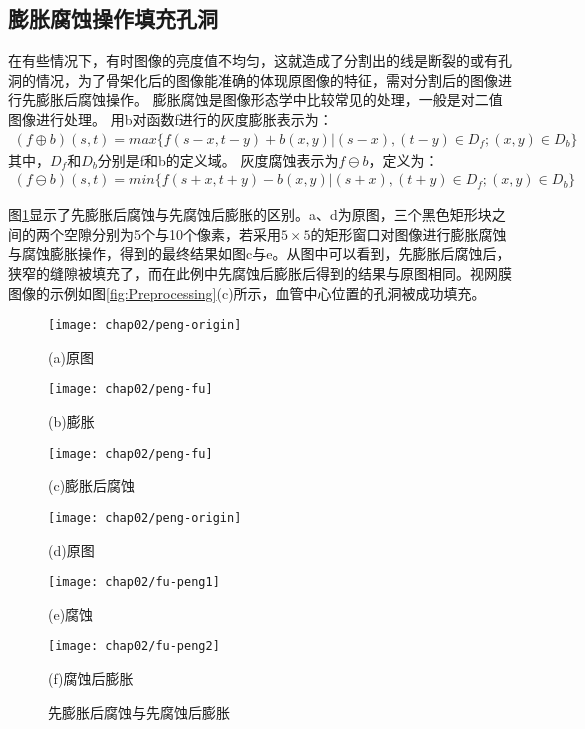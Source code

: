\subsection{膨胀腐蚀操作填充孔洞}
在有些情况下，有时图像的亮度值不均匀，这就造成了分割出的线是断裂的或有孔洞的情况，为了骨架化后的图像能准确的体现原图像的特征，需对分割后的图像进行先膨胀后腐蚀操作。
膨胀腐蚀是图像形态学中比较常见的处理，一般是对二值图像进行处理。
用b对函数f进行的灰度膨胀\cite{gang}表示为：
\begin{align}
(f\oplus b)(s,t)=max\{f(s-x, t-y)+b(x,y)|(s-x),(t-y)\in D_f;(x,y)\in D_b\}
\end{align}
其中，$D_f$和$D_b$分别是f和b的定义域。
灰度腐蚀表示为$f \ominus b$，定义为：
\begin{align}
(f \ominus b)(s,t)=min\{f(s+x, t+y)-b(x,y)|(s+x),(t+y)\in D_f;(x,y)\in D_b\}
\end{align}

图\ref{fig:peng-fu}显示了先膨胀后腐蚀与先腐蚀后膨胀的区别。a、d为原图，三个黑色矩形块之间的两个空隙分别为5个与10个像素，若采用$5\times5$的矩形窗口对图像进行膨胀腐蚀与腐蚀膨胀操作，得到的最终结果如图c与e。从图中可以看到，先膨胀后腐蚀后，狭窄的缝隙被填充了，而在此例中先腐蚀后膨胀后得到的结果与原图相同。视网膜图像的示例如图\ref{fig:Preprocessing}(c)所示，血管中心位置的孔洞被成功填充。

\begin{figure}[H]
\centering
  \begin{minipage}[b]{0.3\textwidth} 
      \centering 
      \texttt{[image: chap02/peng-origin]}
        \centerline{(a)原图}\medskip
    \end{minipage}
  \begin{minipage}[b]{0.3\textwidth}
    \centering
    \texttt{[image: chap02/peng-fu]}
      \centerline{(b)膨胀}\medskip
  \end{minipage}
  \begin{minipage}[b]{0.3\textwidth}
    \centering
    \texttt{[image: chap02/peng-fu]}
      \centerline{(c)膨胀后腐蚀}\medskip
  \end{minipage}
   \begin{minipage}[b]{0.3\textwidth} 
      \centering 
      \texttt{[image: chap02/peng-origin]}
        \centerline{(d)原图}\medskip
    \end{minipage}
  \begin{minipage}[b]{0.3\textwidth}
    \centering
    \texttt{[image: chap02/fu-peng1]}
      \centerline{(e)腐蚀}\medskip
  \end{minipage}
  \begin{minipage}[b]{0.3\textwidth}
    \centering
    \texttt{[image: chap02/fu-peng2]}
      \centerline{(f)腐蚀后膨胀}\medskip
  \end{minipage}
\caption{先膨胀后腐蚀与先腐蚀后膨胀}
\label{fig:peng-fu}
\end{figure}

